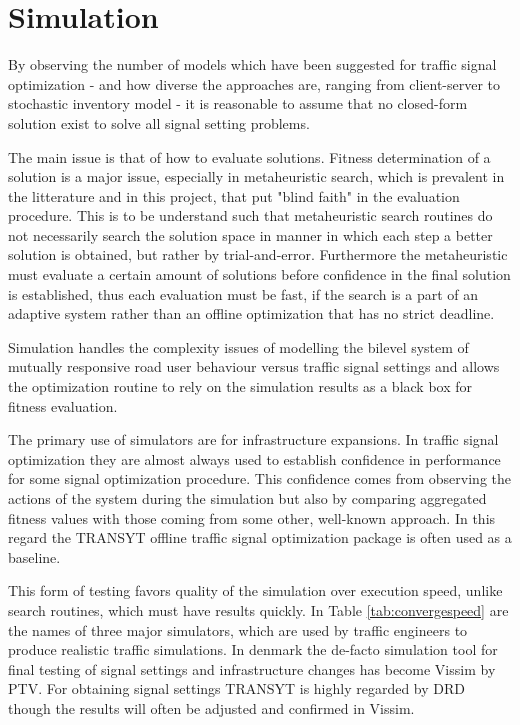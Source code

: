 \section{Simulation}
By observing the number of models which have been suggested for traffic signal optimization - and how diverse the approaches are, ranging from client-server to stochastic inventory model - it is reasonable to assume that no closed-form solution exist to solve all signal setting problems. 

The main issue is that of how to evaluate solutions. Fitness determination of a solution is a major issue, especially in metaheuristic search, which is prevalent in the litterature and in this project, that put "blind faith" in the evaluation procedure. This is to be understand such that metaheuristic search routines do not necessarily search the solution space in manner in which each step a better solution is obtained, but rather by trial-and-error. 
Furthermore the metaheuristic must evaluate a certain amount of solutions before confidence in the final solution is established, thus each evaluation must be fast, if the search is a part of an adaptive system rather than an offline optimization that has no strict deadline.

Simulation handles the complexity issues of modelling the bilevel system of mutually responsive road user behaviour versus traffic signal settings and allows the optimization routine to rely on the simulation results as a black box for fitness evaluation. 

The primary use of simulators are for infrastructure expansions. In traffic signal optimization they are almost always used to establish confidence in performance for some signal optimization procedure. This confidence comes from observing the actions of the system during the simulation but also by comparing aggregated fitness values with those coming from some other, well-known approach. In this regard the TRANSYT offline traffic signal optimization package is often used as a baseline. 

This form of testing favors quality of the simulation over execution speed, unlike search routines, which must have results quickly. 
In Table \ref{tab:convergespeed} are the names of three major simulators, which are used by traffic engineers to produce realistic traffic simulations. 
In denmark the de-facto simulation tool for final testing of signal settings and infrastructure changes has become Vissim by PTV. For obtaining signal settings TRANSYT is highly regarded by DRD though the results will often be adjusted and confirmed in Vissim.

